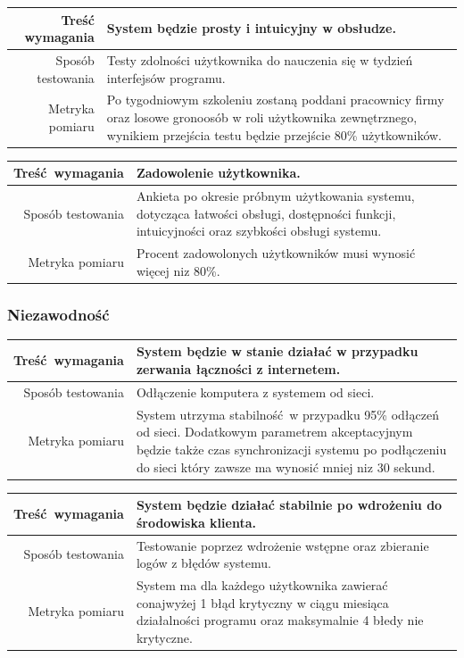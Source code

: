 \documentclass[paper=a4, fontsize=11pt]{scrartcl} %
\begin{document}
\vspace{10 mm}

\begin{tabularx}{\textwidth}{|r|X|}
  \hline
Treść wymagania  & System będzie prosty i intuicyjny w obsłudze. \\ 
  \hline
Sposób testowania  & Testy zdolności użytkownika do nauczenia się w tydzień interfejsów programu. \\ 
  \hline
Metryka pomiaru  & Po tygodniowym szkoleniu zostaną poddani pracownicy firmy oraz losowe gronoosób w roli użytkownika zewnętrznego, wynikiem przejścia testu będzie przejście 80\% użytkowników. \\ 
  \hline
\end{tabularx}

\vspace{10 mm}

\begin{tabularx}{\textwidth}{|r|X|}
  \hline
Treść wymagania  & Zadowolenie użytkownika. \\ 
  \hline
Sposób testowania  & Ankieta po okresie próbnym użytkowania systemu, dotycząca łatwości obsługi, dostępności funkcji, intuicyjności oraz szybkości obsługi systemu. \\ 
  \hline
Metryka pomiaru  & Procent zadowolonych użytkowników musi wynosić więcej niz 80\%. \\ 
  \hline
\end{tabularx}

\subsubsection{Niezawodność}

\begin{tabularx}{\textwidth}{|r|X|}
  \hline
Treść wymagania & System będzie w stanie działać w przypadku zerwania łączności z internetem. \\ 
  \hline
Sposób testowania & Odłączenie komputera z systemem od sieci. \\ 
  \hline
Metryka pomiaru & System utrzyma stabilność w przypadku 95\% odłączeń od sieci. Dodatkowym parametrem
akceptacyjnym będzie także czas synchronizacji systemu po podłączeniu do sieci który zawsze ma wynosić mniej niz
30 sekund. \\ 
  \hline
\end{tabularx}

\vspace{10 mm}

\begin{tabularx}{\textwidth}{|r|X|}
  \hline
Treść wymagania & System będzie działać stabilnie po wdrożeniu do środowiska klienta. \\ 
  \hline
Sposób testowania & Testowanie poprzez wdrożenie wstępne oraz zbieranie logów z błędów systemu. \\ 
  \hline
Metryka pomiaru & System ma dla każdego użytkownika zawierać conajwyżej 1 błąd krytyczny w ciągu miesiąca
działalności programu oraz maksymalnie 4 błedy nie krytyczne. \\ 
  \hline
\end{tabularx}
\end{document}
